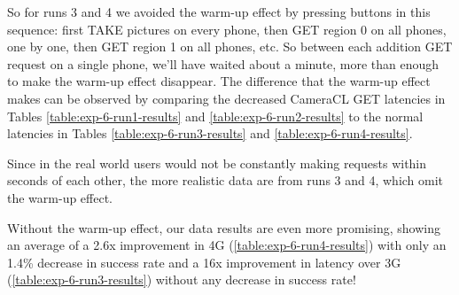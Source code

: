 So for runs 3 and 4 we avoided the warm-up effect by pressing buttons in this sequence: first TAKE pictures on every phone, then GET region 0 on all phones, one by one, then GET region 1 on all phones, etc. So between each addition GET request on a single phone, we'll have waited about a minute, more than enough to make the warm-up effect disappear.  The difference that the warm-up effect makes can be observed by comparing the decreased CameraCL GET latencies in Tables \ref{table:exp-6-run1-results} and \ref{table:exp-6-run2-results} to the normal latencies in Tables \ref{table:exp-6-run3-results} and \ref{table:exp-6-run4-results}. 

Since in the real world users would not be constantly making requests within seconds of each other, the more realistic data are from runs 3 and 4, which omit the warm-up effect.

Without the warm-up effect, our data results are even more promising, showing an average of a 2.6x improvement in 4G (\ref{table:exp-6-run4-results}) with only an 1.4\% decrease in success rate and a 16x improvement in latency over 3G (\ref{table:exp-6-run3-results}) without any decrease in success rate!